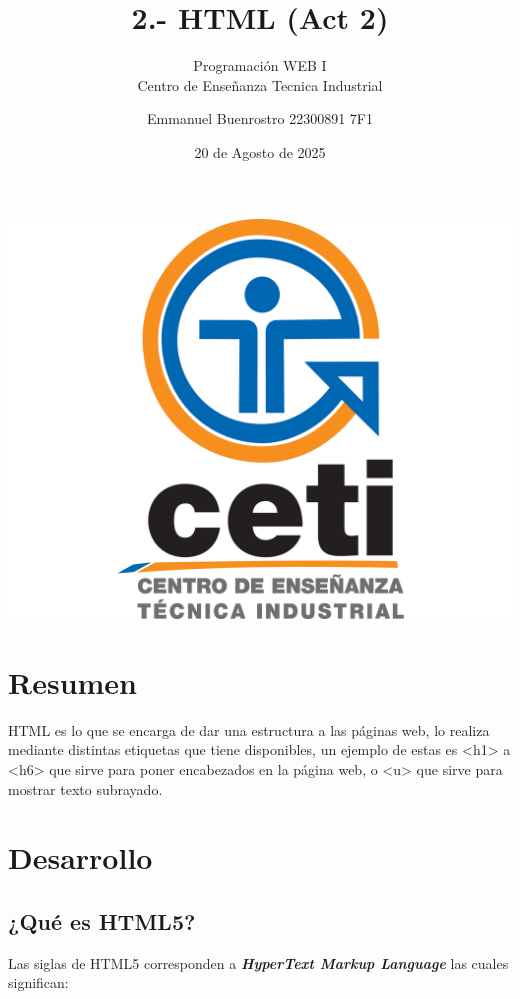 \documentclass[11pt]{scrartcl}
\title {2.- HTML (Act 2)}
\subtitle{Programación WEB I \\ Centro de Enseñanza Tecnica Industrial}
\date{20 de Agosto de 2025}
\author{Emmanuel Buenrostro 22300891 7F1}
\begin{document}
\maketitle


\begin{center}
   \includegraphics[scale=0.15]{cetilogo.jpg} 
\end{center}
\newpage
\tableofcontents


\section{Resumen}

HTML es lo que se encarga de dar una estructura a las páginas web, lo realiza mediante distintas etiquetas que tiene disponibles, un ejemplo de estas es <h1> a <h6> que sirve para poner encabezados en la página web, o <u> que sirve para mostrar texto subrayado.


\section{Desarrollo}

\subsection{¿Qué es HTML5?}


Las siglas de HTML5 corresponden a \textbf{\textit{HyperText Markup Language}} las cuales significan:
\end{document}
